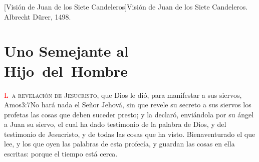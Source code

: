 [Visión de Juan de los Siete Candeleros]{Visión de Juan de los Siete Candeleros. Albrecht Dürer, 1498.}

\pagestyle{fancy}
\mainmatter
\trimFrame
\chapter{Uno Semejante \linebreak[0]al \mbox{Hijo del Hombre}}
\begingroup
\let\clearpage\relax
\endgroup
\lettrine[lines=3,loversize=0.05]{\textcolor{red}{L}}{\ a revelación de Jesucristo}, que Dios le dió, para manifestar a sus siervos,%
			{Amos}{3:7}{No hará nada el Señor Jehová, sin que revele su secreto a sus siervos los profetas}
 las cosas que deben suceder presto; y la declaró, enviándola por su ángel a Juan su siervo, %
el cual ha dado testimonio de la palabra de Dios, y del testimonio de Jesucristo, y de todas las cosas que ha visto. %
Bienaventurado el que lee, y los que oyen las palabras de esta profecía, y guardan las cosas en ella escritas: porque el tiempo está cerca.
